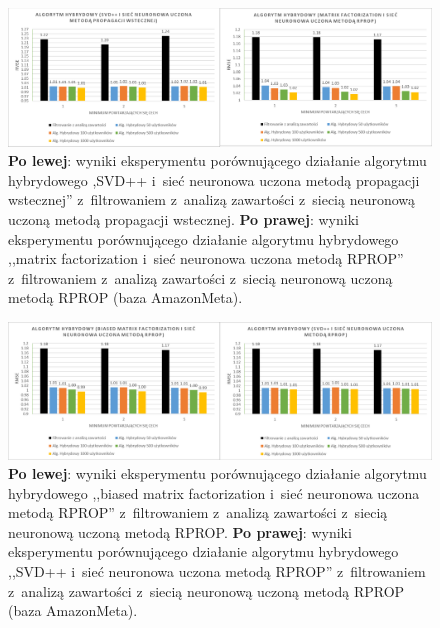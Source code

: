 \documentclass[twoside]{iisthesis}
\begin{document}
		\begin{figure}
			\centering
			\includegraphics[width=1\textwidth]{am_exphybrid1_2}			
			\caption{\textbf{Po lewej}: wyniki eksperymentu porównującego działanie algorytmu hybrydowego ,SVD++ i~sieć neuronowa uczona metodą propagacji wstecznej'' z~filtrowaniem z~analizą zawartości z~siecią neuronową uczoną metodą propagacji wstecznej. \textbf{Po prawej}: wyniki eksperymentu porównującego działanie algorytmu hybrydowego ,,matrix factorization i~sieć neuronowa uczona metodą RPROP'' z~filtrowaniem z~analizą zawartości z~siecią neuronową uczoną metodą RPROP (baza AmazonMeta).}
			\label{fig:am_exphybrid1_2}
		\end{figure}
	
		\begin{figure}
			\centering
			\includegraphics[width=1\textwidth]{am_exphybrid1_3}			
			\caption{\textbf{Po lewej}: wyniki eksperymentu porównującego działanie algorytmu hybrydowego ,,biased matrix factorization i~sieć neuronowa uczona metodą RPROP'' z~filtrowaniem z~analizą zawartości z~siecią neuronową uczoną metodą RPROP. \textbf{Po prawej}: wyniki eksperymentu porównującego działanie algorytmu hybrydowego ,,SVD++ i~sieć neuronowa uczona metodą RPROP'' z~filtrowaniem z~analizą zawartości z~siecią neuronową uczoną metodą RPROP (baza AmazonMeta).}
			\label{fig:am_exphybrid1_3}
		\end{figure}
	
\end{document}
